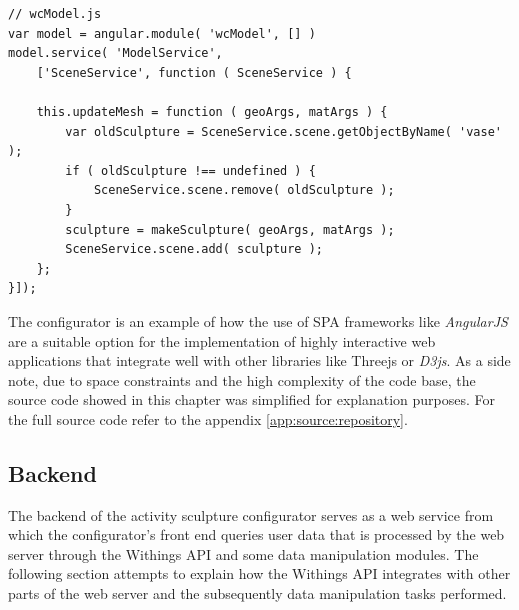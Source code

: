 \documentclass[../medieninformatik-arbeit.tex]{subfiles}
\begin{document}
\begin{lstlisting}[style=htmlcssjs, caption={Sculpture update function},label=list:ui-binding-service]
// wcModel.js
var model = angular.module( 'wcModel', [] )
model.service( 'ModelService',
	['SceneService', function ( SceneService ) {

	this.updateMesh = function ( geoArgs, matArgs ) {
	    var oldSculpture = SceneService.scene.getObjectByName( 'vase' );
	    if ( oldSculpture !== undefined ) {
	    	SceneService.scene.remove( oldSculpture );
	    }
	    sculpture = makeSculpture( geoArgs, matArgs );
	    SceneService.scene.add( sculpture );
	};
}]);
\end{lstlisting}

The configurator is an example of how the use of SPA frameworks like \textit{AngularJS} are a suitable option for the implementation of highly interactive web applications that integrate well with other libraries like \textit{}Threejs or \textit{D3js}. As a side note, due to space constraints and the high complexity of the code base, the source code showed in this chapter was simplified for explanation purposes. For the full source code refer to the appendix \ref{app:source:repository}. 

\subsection{Backend}
The backend of the activity sculpture configurator serves as a web service from which the configurator's front end queries user data that is processed by the web server through the Withings API and some data manipulation modules. The following section attempts to explain how the Withings API integrates with other parts of the web server and the subsequently data manipulation tasks performed. 
\end{document}
